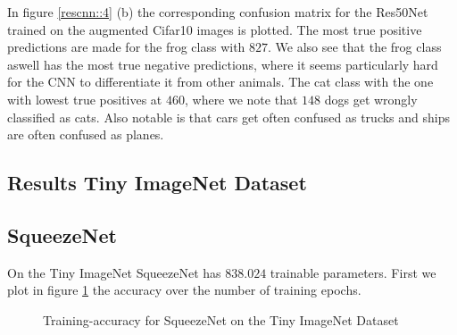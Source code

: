 \documentclass[11pt]{article}
\begin{document}
In figure \ref{rescnn::4} (b) the corresponding confusion matrix for the Res50Net trained on the augmented Cifar10 images is plotted. The most true positive predictions are made for the frog class with $827$. We also see that the frog class aswell has the most true negative predictions, where it seems particularly hard for the CNN to differentiate it from other animals. The cat class with the one with lowest true positives at $460$, where we note that $148$ dogs get wrongly classified as cats. Also notable is that cars get often confused as trucks and ships are often confused as planes.

\subsection{Results Tiny ImageNet Dataset}
\subsection{SqueezeNet}
On the Tiny ImageNet SqueezeNet has $838.024$ trainable parameters. First we plot in figure \ref{rescnn::5} the accuracy over the number of training epochs.

\begin{figure}
\centering
{}
  \hfill
  \hfill
\caption{Training-accuracy for SqueezeNet on the Tiny ImageNet Dataset}
\label{rescnn::5}
\end{figure}
\end{document}
